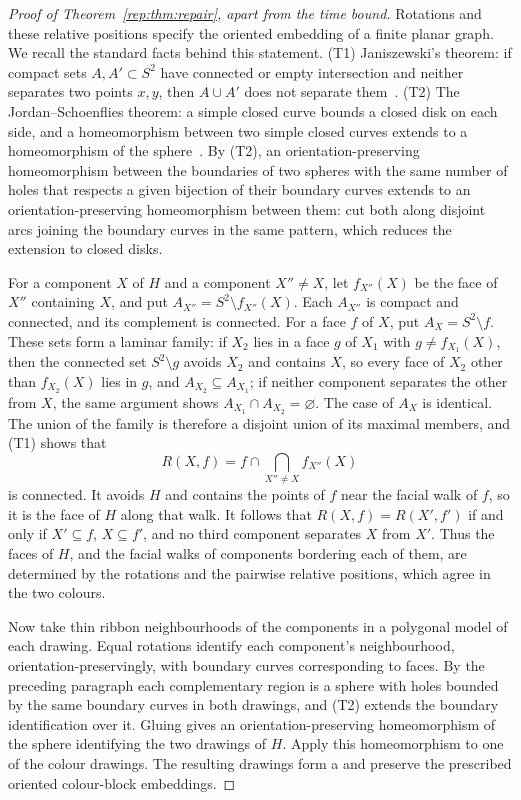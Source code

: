 \begin{proof}[Proof of Theorem~\ref{rep:thm:repair}, apart from the time bound]
Rotations and these relative positions specify the oriented embedding of
a finite planar graph.  We recall the standard facts behind this
statement.  (T1) Janiszewski's theorem: if compact sets
$A,A'\subset S^2$ have connected or empty intersection and neither
separates two points $x,y$, then $A\cup A'$ does not separate
them~\cite{newman}.  (T2) The Jordan--Schoenflies theorem: a simple closed
curve bounds a closed disk on each side, and a homeomorphism between two
simple closed curves extends to a homeomorphism of the
sphere~\cite[Chapter~2]{mohar}.  By (T2), an orientation-preserving
homeomorphism between the boundaries of two spheres with the same number
of holes that respects a given bijection of their boundary curves extends
to an orientation-preserving homeomorphism between them: cut both along
disjoint arcs joining the boundary curves in the same pattern, which
reduces the extension to closed disks.

For a component $X$ of $H$ and a component $X''\ne X$, let $f_{X''}(X)$
be the face of $X''$ containing $X$, and put $A_{X''}=S^2\setminus
f_{X''}(X)$.  Each $A_{X''}$ is compact and connected, and its complement
is connected.  For a face $f$ of $X$, put $A_X=S^2\setminus f$.  These
sets form a laminar family: if $X_2$ lies in a face $g$ of $X_1$ with
$g\ne f_{X_1}(X)$, then the connected set $S^2\setminus g$ avoids $X_2$
and contains $X$, so every face of $X_2$ other than $f_{X_2}(X)$ lies in
$g$, and $A_{X_2}\subseteq A_{X_1}$; if neither component separates the
other from $X$, the same argument shows $A_{X_1}\cap A_{X_2}=\varnothing$.
The case of $A_X$ is identical.  The union of the family is therefore a
disjoint union of its maximal members, and (T1) shows that
\[
 R(X,f)=f\cap\bigcap_{X''\ne X}f_{X''}(X)
\]
is connected.  It avoids $H$ and contains the points of $f$ near the
facial walk of $f$, so it is the face of $H$ along that walk.  It follows
that $R(X,f)=R(X',f')$ if and only if $X'\subseteq f$, $X\subseteq f'$,
and no third component separates $X$ from $X'$.  Thus the faces of $H$,
and the facial walks of components bordering each of them, are determined
by the rotations and the pairwise relative positions, which agree in the
two colours.

Now take thin ribbon neighbourhoods of the components in a polygonal model
of each drawing.  Equal rotations identify each component's neighbourhood,
orientation-preservingly, with boundary curves corresponding to faces.  By
the preceding paragraph each complementary region is a sphere with holes
bounded by the same boundary curves in both drawings, and (T2) extends the
boundary identification over it.  Gluing gives an orientation-preserving
homeomorphism of the sphere identifying the two drawings of $H$.  Apply
this homeomorphism to one of the colour drawings.  The resulting drawings
form a \SEFE{} and preserve the prescribed oriented colour-block
embeddings.
\end{proof}

